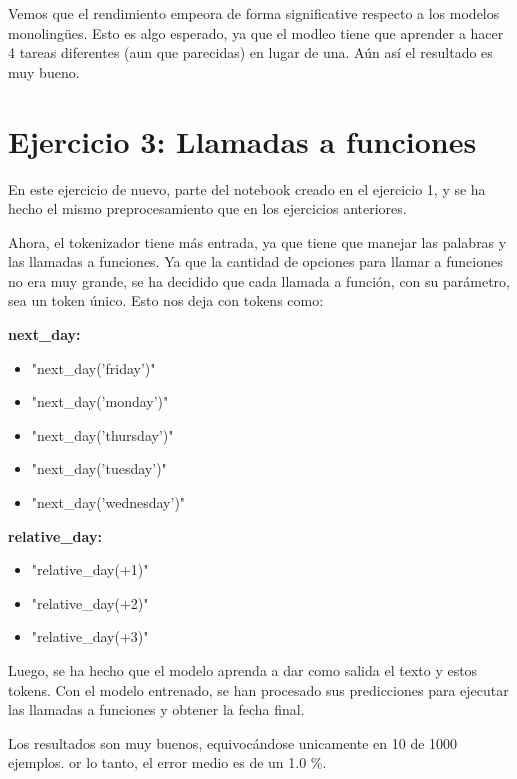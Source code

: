 \documentclass[11pt,spanish,listoffigures,listoftables]{tfgetsinf}
\begin{document}
Vemos que el rendimiento empeora de forma significative respecto a los modelos monolingües. Esto es algo esperado, ya que el modleo tiene que aprender a hacer 4 tareas diferentes (aun que parecidas) en lugar de una. Aún así el resultado es muy bueno.

\section{Ejercicio 3: Llamadas a funciones}
En este ejercicio de nuevo, parte del notebook creado en el ejercicio 1, y se ha hecho el mismo preprocesamiento que en los ejercicios anteriores.

Ahora, el tokenizador tiene más entrada, ya que tiene que manejar las palabras y las llamadas a funciones. Ya que la cantidad de opciones para llamar a funciones no era muy grande, se ha decidido que cada llamada a función, con su parámetro, sea un token único. Esto nos deja con tokens como:

\noindent
\begin{minipage}[t]{0.48\textwidth}
\textbf{next\_day:}
\begin{itemize}[topsep=0pt]
  \item "next\_day('friday')"
  \item "next\_day('monday')"
  \item "next\_day('thursday')"
  \item "next\_day('tuesday')"
  \item "next\_day('wednesday')"
\end{itemize}
\end{minipage}
\hfill
\begin{minipage}[t]{0.48\textwidth}
\textbf{relative\_day:}
\begin{itemize}[topsep=0pt]
  \item "relative\_day(+1)"
  \item "relative\_day(+2)"
  \item "relative\_day(+3)"
\end{itemize}
\end{minipage}

Luego, se ha hecho que el modelo aprenda a dar como salida el texto y estos tokens. Con el modelo entrenado, se han procesado sus predicciones para ejecutar las llamadas a funciones y obtener la fecha final. 

Los resultados son muy buenos, equivocándose unicamente en 10 de 1000 ejemplos. or lo tanto, el error medio es de un 1.0 \%.
\end{document}
